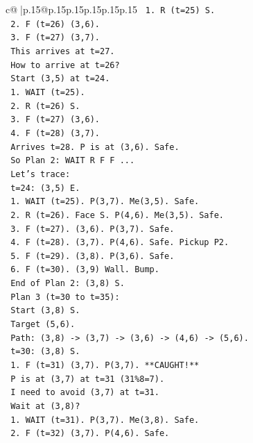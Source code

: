 \documentclass{article}
\begin{document}
{\begin{supertabular}{c@{$\;$}|p{.15\linewidth}@{}p{.15\linewidth}p{.15\linewidth}p{.15\linewidth}p{.15\linewidth}p{.15\linewidth}}
{{{\texttt{   1. R (t=25) S.} \\
\texttt{   2. F (t=26) (3,6).} \\
\texttt{   3. F (t=27) (3,7).} \\
\texttt{   This arrives at t=27.} \\
\texttt{   How to arrive at t=26?} \\
\texttt{   Start (3,5) at t=24.} \\
\texttt{   1. WAIT (t=25).} \\
\texttt{   2. R (t=26) S.} \\
\texttt{   3. F (t=27) (3,6).} \\
\texttt{   4. F (t=28) (3,7).} \\
\texttt{   Arrives t=28. P is at (3,6). Safe.} \\
\texttt{   So Plan 2: WAIT R F F ...} \\
\texttt{   Let's trace:} \\
\texttt{   t=24: (3,5) E.} \\
\texttt{   1. WAIT (t=25). P(3,7). Me(3,5). Safe.} \\
\texttt{   2. R (t=26). Face S. P(4,6). Me(3,5). Safe.} \\
\texttt{   3. F (t=27). (3,6). P(3,7). Safe.} \\
\texttt{   4. F (t=28). (3,7). P(4,6). Safe. Pickup P2.} \\
\texttt{   5. F (t=29). (3,8). P(3,6). Safe.} \\
\texttt{   6. F (t=30). (3,9) Wall. Bump.} \\
\texttt{   End of Plan 2: (3,8) S.} \\
\texttt{   Plan 3 (t=30 to t=35):} \\
\texttt{   Start (3,8) S.} \\
\texttt{   Target (5,6).} \\
\texttt{   Path: (3,8) {-}> (3,7) {-}> (3,6) {-}> (4,6) {-}> (5,6).} \\
\texttt{   t=30: (3,8) S.} \\
\texttt{   1. F (t=31) (3,7). P(3,7). **CAUGHT!**} \\
\texttt{   P is at (3,7) at t=31 (31\%8=7).} \\
\texttt{   I need to avoid (3,7) at t=31.} \\
\texttt{   Wait at (3,8)?} \\
\texttt{   1. WAIT (t=31). P(3,7). Me(3,8). Safe.} \\
\texttt{   2. F (t=32) (3,7). P(4,6). Safe.} \\
}}}
\end{supertabular}}
\end{document}
